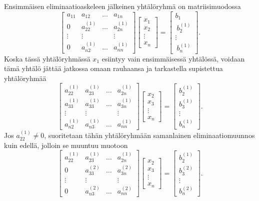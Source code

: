 Ensimmäisen eliminaatioaskeleen jälkeinen yhtälöryhmä on matriisimuodossa
\[
\begin{bmatrix}
a_{11} & a_{12}       & \ldots & a_{1n} \\
     0 & a_{22}^{(1)} & \ldots & a_{2n}^{(1)} \\
\vdots & \vdots       &        & \vdots \\
     0 & a_{n2}^{(1)} & \ldots & a_{nn}^{(1)}
\end{bmatrix}
\begin{bmatrix}
x_1 \\ x_2 \\ \vdots \\ x_n
\end{bmatrix} =
\begin{bmatrix}
b_1 \\ \ b_2^{(1)} \\ \vdots \\ \ b_n^{(1)}
\end{bmatrix}.
\]
Koska tässä yhtälöryhmässä $x_1$ esiintyy vain ensimmäisessä yhtälössä, voidaan tämä yhtälö 
jättää jatkossa omaan rauhaansa ja tarkastella supistettua yhtälöryhmää
\[
\begin{bmatrix}
a_{22}^{(1)} & a_{23}^{(1)} & \ldots & a_{2n}^{(1)} \\
a_{33}^{(1)} & a_{33}^{(1)} & \ldots & a_{3n}^{(1)} \\
\vdots & \vdots      &      & \vdots \\
a_{n2}^{(1)} & a_{n3}^{(1)} & \ldots & a_{nn}^{(1)}
\end{bmatrix}
\begin{bmatrix}
x_2 \\ x_3 \\ \vdots \\ x_n
\end{bmatrix} =
\begin{bmatrix}
b_2^{(1)} \\ b_3^{(1)} \\ \vdots \\ b_n^{(1)}
\end{bmatrix}.
\]
Jos $a_{22}^{(1)} \neq 0$, suoritetaan tähän yhtälöryhmään samanlainen eliminaatiomuunnos kuin
edellä, jolloin se muuntuu muotoon
\[
\begin{bmatrix}
a_{22}^{(1)} & a_{23}^{(1)} & \ldots & a_{2n}^{(1)} \\
0 & a_{33}^{(2)} & \ldots & a_{3n}^{(2)} \\
\vdots & \vdots      &      & \vdots \\
0 & a_{n3}^{(2)} & \ldots & a_{nn}^{(2)}
\end{bmatrix}
\begin{bmatrix}
x_2 \\ x_3 \\ \vdots \\ x_n
\end{bmatrix} =
\begin{bmatrix}
b_2^{(1)} \\ b_3^{(2)} \\ \vdots \\ b_n^{(2)}
\end{bmatrix}.
\]
